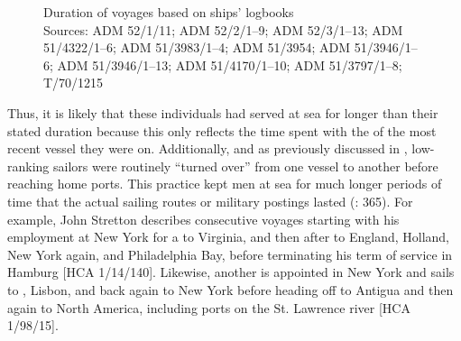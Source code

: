 \begin{figure}

\caption{\label{fig:key:4.3} Duration of voyages based on ships’ logbooks\\
{\tiny Sources: ADM 52/1/11; ADM 52/2/1–9; ADM 52/3/1–13; ADM 51/4322/1–6; ADM 51/3983/1–4; ADM 51/3954; ADM 51/3946/1–6; ADM 51/3946/1–13; ADM 51/4170/1–10; ADM 51/3797/1–8; T/70/1215}
}
\end{figure}


Thus, it is likely that these individuals had served at sea for longer than their stated duration because this only reflects the time spent with the  of the most recent vessel they were on. Additionally, and as previously discussed in , low-ranking sailors were routinely “turned over” from one vessel to another before reaching home ports. This practice kept men at sea for much longer periods of time that the actual sailing routes or military postings lasted (\citealt{AdkinsAdkins2008}: 365). For example, John Stretton describes consecutive voyages starting with his employment at New York for a  to Virginia, and then after to England, Holland, New York again, and Philadelphia Bay, before terminating his term of service in Hamburg [HCA 1/14/140]. Likewise, another  is appointed in New York and sails to , Lisbon, and back again to New York before heading off to Antigua and then again to North America, including ports on the St. Lawrence river [HCA 1/98/15]. 

